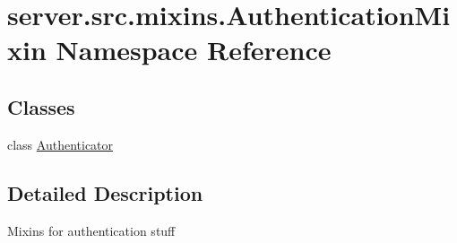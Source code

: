\hypertarget{namespaceserver_1_1src_1_1mixins_1_1_authentication_mixin}{}\section{server.\+src.\+mixins.\+Authentication\+Mixin Namespace Reference}
\label{namespaceserver_1_1src_1_1mixins_1_1_authentication_mixin}
\subsection*{Classes}
\begin{DoxyCompactItemize}
\item 
class \hyperlink{classserver_1_1src_1_1mixins_1_1_authentication_mixin_1_1_authenticator}{Authenticator}
\end{DoxyCompactItemize}


\subsection{Detailed Description}
\begin{DoxyVerb}Mixins for authentication stuff\end{DoxyVerb}
 
